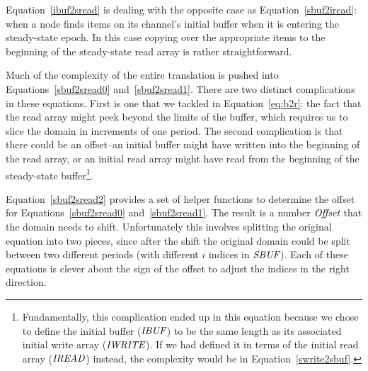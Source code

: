 Equation~\ref{ibuf2sread} is dealing with the opposite case as
Equation~\ref{sbuf2iread}: when a node finds items on its channel's
initial buffer when it is entering the steady-state epoch.  In this
case copying over the appropriate items to the beginning of the
steady-state read array is rather straightforward.

Much of the complexity of the entire translation is pushed into
Equations~\ref{sbuf2sread0} and~\ref{sbuf2sread1}.  There are two
distinct complications in these equations.  First is one that we
tackled in Equation~\ref{eq:b2r}: the fact that the read array might
peek beyond the limits of the buffer, which requires us to slice the
domain in increments of one period.  The second complication is that
there could be an offset--an initial buffer might have written into
\clearpage \noindent the beginning of the read array, or an initial
read array might have read from the beginning of the steady-state
buffer\footnote{Fundamentally, this complication ended up in this
equation because we chose to define the initial buffer ($\mbox{\it IBUF}$)
to be the same length as its associated initial write array
($\mbox{\it IWRITE}$).  If we had defined it in terms of the initial read
array ($\mbox{\it IREAD}$) instead, the complexity would be in
Equation~\ref{swrite2sbuf}.}.

Equation~\ref{sbuf2sread2} provides a set of helper functions to
determine the offset for Equations~\ref{sbuf2sread0}
and~\ref{sbuf2sread1}.  The result is a number $\mbox{\it Offset}$ that the
domain needs to shift.  Unfortunately this involves splitting the
original equation into two pieces, since after the shift the original
domain could be split between two different periods (with different
$i$ indices in $\mbox{\it SBUF}$).  Each of these equations is clever about
the sign of the offset to adjust the indices in the right direction.
